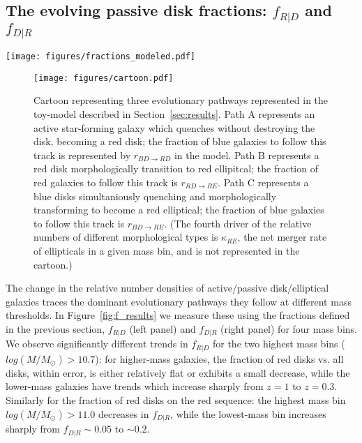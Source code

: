 \subsection{The evolving passive disk fractions: $f_{R|D}$ and $f_{D|R}$} 

\begin{figure*}
\centering
\texttt{[image: figures/fractions\_modeled.pdf]}
\caption{\textbf{Left:} Passive disk fraction ($\rm N_{red~disks}/(N_{red~disks}+N_{blue~disks})$) vs redshift in four mass bins. \textbf{Right:} Fraction of disks on the red sequence ($\rm N_{red~disks}/(N_{red~disks}+N_{red~ellipticals})$) vs redshift in four mass bins. The solid lines represent the evolution of the fractions computed by the toy-model described in Section~\ref{sec:results} using rate parameters which yielded the lowest $\chi^2$.}
\label{fig:f_results}
\end{figure*}

\begin{figure}
\centering
\texttt{[image: figures/cartoon.pdf]}
\caption{Cartoon representing three evolutionary pathways represented in the toy-model described in Section~\ref{sec:results}. Path A represents an active star-forming galaxy which quenches without destroying the disk, becoming a red disk; the fraction of blue galaxies to follow this track is represented by $r_{BD \rightarrow RD}$ in the model. Path B represents a red disk morphologically transition to red ellipitcal; the fraction of red galaxies to follow this track is $r_{RD \rightarrow RE}$. Path C represents a blue disks simultaniously quenching and morphologically transforming to become a red elliptical; the fraction of blue galaxies to follow this track is $r_{BD \rightarrow RE}$. (The fourth driver of the relative numbers of different morphological types is $\kappa_{RE}$, the net merger rate of ellipticals in a given mass bin, and is not represented in the cartoon.) }
\label{fig:cartoon}
\end{figure}
The change in the relative number densities of active/passive disk/elliptical galaxies traces the dominant evolutionary pathways they follow at different mass thresholds. In Figure~\ref{fig:f_results} we measure these using the fractions defined in the previous section, $f_{R|D}$ (left panel) and $f_{D|R}$ (right panel) for four mass bins. We observe significantly different trends in $f_{R|D}$ for the two highest mass bins ($log(M/M_{\odot})>10.7$): for higher-mass galaxies, the fraction of red disks vs. all disks, within error, is either relatively flat or exhibits a small decrease, while the lower-mass galaxies have trends which increase sharply from $z=1$ to $z=0.3$. Similarly for the fraction of red disks on the red sequence: the highest mass bin $log(M/M_{\odot})>11.0$ decreases in $f_{D|R}$, while the lowest-mass bin increases sharply from $f_{D|R}\sim0.05$ to $\sim 0.2$.  

